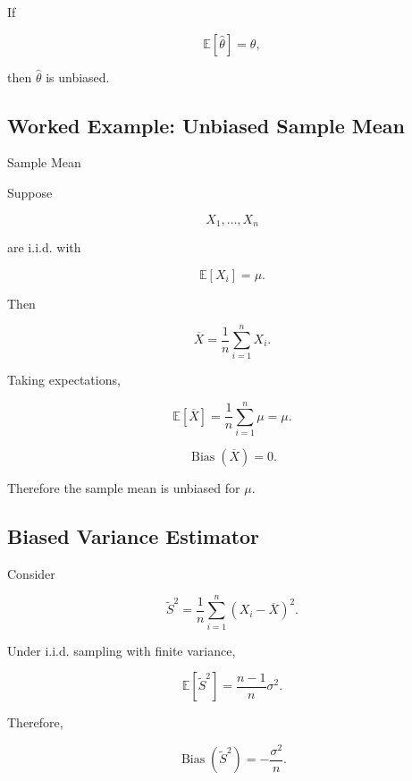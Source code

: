 If

\[
\mathbb{E}[\widehat{\theta}]
=
\theta,
\]

then \(\widehat{\theta}\) is unbiased.

\subsection{Worked Example: Unbiased Sample Mean}
\label{subsec:worked-unbiased-sample-mean}

\begin{workedexamplebox}{Sample Mean}

Suppose

\[
X_1,\ldots,X_n
\]

are i.i.d. with

\[
\mathbb{E}[X_i]=\mu.
\]

Then

\[
\overline{X}
=
\frac1n
\sum_{i=1}^{n}X_i.
\]

Taking expectations,

\[
\mathbb{E}[\overline{X}]
=
\frac1n
\sum_{i=1}^{n}\mu
=
\mu.
\]

\begin{answerbox}
\[
\boxed{
\operatorname{Bias}(\overline{X})=0.
}
\]
\end{answerbox}

Therefore the sample mean is unbiased for \(\mu\).

\end{workedexamplebox}

\subsection{Biased Variance Estimator}
\label{subsec:biased-variance-estimator}

Consider

\[
\widetilde{S}^2
=
\frac1n
\sum_{i=1}^{n}
(X_i-\overline{X})^2.
\]

Under i.i.d. sampling with finite variance,

\[
\boxed{
\mathbb{E}[\widetilde{S}^2]
=
\frac{n-1}{n}\sigma^2.
}
\]

Therefore,

\[
\boxed{
\operatorname{Bias}(\widetilde{S}^2)
=
-\frac{\sigma^2}{n}.
}
\]

